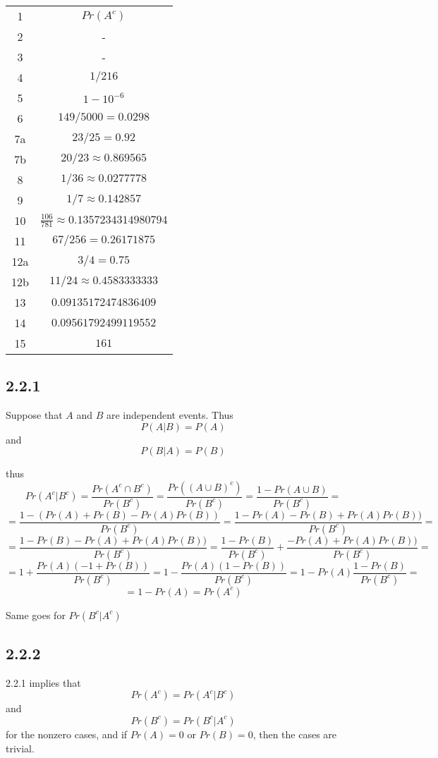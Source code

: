 \documentclass[11pt,oneside,titlepage]{book}
\begin{document}
\begin{tabular}[center]{||c | c|| }
  \hline
  1 & $Pr(A^c)$ \\
  2 & - \\
  3 & - \\
  4 & $1/216$ \\
  5 & $1 - 10^{-6}$\\
  6 & $149/5000 = 0.0298$\\
  7a & $23/25 = 0.92$ \\
  7b & $20/23 \approx 0.869565$ \\
  8 & $1/36 \approx 0.0277778$ \\
  9 & $1/7 \approx 0.142857$ \\
  10 & $\frac{106}{781} \approx 0.1357234314980794$ \\
  11 & $67/256 = 0.26171875$ \\
  12a & $3/4 = 0.75$ \\
  12b & $11/24 \approx 0.4583333333$ \\
  13 & $0.09135172474836409$ \\
  14 & $0.09561792499119552$ \\
  15 & $161$ \\ 
  \hline 
\end{tabular}

\subsection*{2.2.1}

Suppose that $A$ and $B$ are independent events. Thus
$$P(A|B) = P(A)$$
and
$$P(B|A) = P(B)$$

thus 
$$Pr(A^c|B^c) = \frac{Pr(A^c \cap B^c)}{Pr(B^c)} = \frac{Pr((A \cup B)^c)}{Pr(B^c)} =
\frac{1 - Pr(A \cup B)}{Pr(B^c)} =  $$
$$ =
\frac{1 - (Pr(A) + Pr(B) - Pr(A) Pr(B))}{Pr(B^c)} =
\frac{1 - Pr(A) - Pr(B) + Pr(A) Pr(B))}{Pr(B^c)} =  
$$
$$ =
\frac{1  - Pr(B) - Pr(A) + Pr(A) Pr(B))}{Pr(B^c)} =
\frac{1  - Pr(B)}{Pr(B^c)} +  \frac{ - Pr(A) + Pr(A) Pr(B))}{Pr(B^c)} =  
$$
$$
=
1 +  \frac{ Pr(A)( -1 + Pr(B))}{Pr(B^c)} =
1 -  \frac{ Pr(A)(1 - Pr(B))}{Pr(B^c)} =
1 -  Pr(A) \frac{ 1 - Pr(B)}{Pr(B^c)} =  
$$
$$
= 1 - Pr(A) = Pr(A^c)
$$

Same goes for $Pr(B^c|A^c)$

\subsection*{2.2.2}

2.2.1 implies that
$$Pr(A^c) = Pr(A^c|B^c)$$
and
$$Pr(B^c) = Pr(B^c|A^c)$$
for the nonzero cases, and if $Pr(A) = 0$ or $Pr(B) = 0$, then the cases are trivial. 
\end{document}
